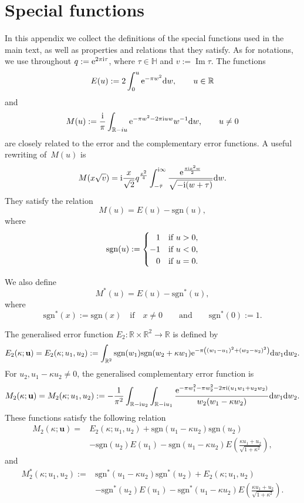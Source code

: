 \documentclass[10pt,a4paper]{amsart}
\def\be{\begin{equation}} \def\ee{\end{equation}}
\def\BR{\mathbb{R}}
\def\BH{\mathbb{H}}
\def\sgn{\mathrm{sgn}}
\theoremstyle{definition}
\numberwithin{equation}{section}
\begin{document}
\appendix

\section{Special functions}\label{app:specialFn}

In this appendix we collect the definitions of the special functions used in the main text, as well as properties and relations that they satisfy. As for notations, we use throughout $q:={\rm e}^{2\pi {\rm i}\tau}$, where $\tau \in \BH$ and $v:=\operatorname{Im} \tau$. The functions
\[ %
E(u) := 2\int_0^u {\rm e}^{-\pi w^2} {\rm d}w, \qquad u\in \mathbb{R}
\]
and	
\be \label{def:M}
M(u):=\frac{{\rm i}}{\pi} \int_{\mathbb{R} - i u}
{\rm e}^{-\pi w^2 -2\pi {\rm i} u w} w^{-1} {\rm d}w, \qquad u\neq 0
\ee
are closely related to the error and the complementary error functions. A useful rewriting of~$M(u)$ is \cite{zwegers2008mock}
\begin{equation}
\label{eq:error_rewriting}
M(x\sqrt{v})={\rm i}\frac{x}{\sqrt{2}} q^{\frac{x^2}{4}} \int_{-\bar{\tau}}^{{\rm i}\infty} \frac{{\rm e}^{\frac{\pi {\rm i} x^2 w}{2}}}{\sqrt{-{\rm i}(w+\tau)}}{\rm d}w .
\end{equation}
They satisfy the relation
\[
M(u)=E(u)-\sgn(u),
\]
where
\[
\sgn(u):=\begin{cases}
	\hphantom{-}1 & \text{if}\ u>0, \\
	-1 & \text{if}\ u<0, \\
	\hphantom{-}0 &\text{if}\ u=0.
\end{cases}
\]

We also define
\[
M^\ast(u)=E(u)-\sgn^\ast(u),
\]
where
\[
\sgn^*(x) := \sgn (x) \quad \text{if}\quad x\neq 0\qquad\text{and} \qquad \sgn^*(0) :=1 .
\]

The generalised error function $E_2\colon\BR\times \BR^2 \to \BR$ is defined by
\[
E_2(\kappa ; \mathbf{u}) = E_2(\kappa ; u_1,u_2) := \int_{\BR^2} \sgn(w_1) \sgn(w_2+\kappa w_1)
{\rm e}^{-\pi\left( (w_1-u_1)^2 + (w_2-u_2)^2 \right)} {\rm d}w_1 {\rm d}w_2 .
\]
For $u_2,u_1-\kappa u_2 \neq 0$, the generalised complementary error function is
\be \label{def:M2}
M_2(\kappa ; \mathbf{u}) = M_2(\kappa ; u_1,u_2) := - \frac{1}{\pi^2} \int_{\mathbb{R} - {\rm i} u_2} \int_{\mathbb{R} - {\rm i} u_1}
\frac{{\rm e}^{ -\pi w_1^2 -\pi w_2^2 - 2\pi {\rm i}
		(u_1 w_1 + u_2 w_2) }}{w_2(w_1-\kappa w_2)} {\rm d}w_1{\rm d}w_2 .
\ee
These functions satisfy the following relation
\begin{align*} %
	M_2 (\kappa ; \mathbf{u})
	={}& E_2(\kappa ; u_1, u_2) + \sgn(u_1-\kappa u_2) \sgn(u_2) \\
	& -\sgn(u_2) E(u_1) - \sgn(u_1-\kappa u_2) E \left( \frac{\kappa u_1 + u_2 }{\sqrt{1+\kappa^2}} \right),
\end{align*}
 and
\begin{align}
	M_2^*(\kappa ; u_1, u_2) :={}& \sgn^*(u_1-\kappa u_2) \sgn^*(u_2)
	+ E_2(\kappa; u_1,u_2) \nonumber \\
	& - \sgn^*(u_2) E(u_1) - \sgn^*(u_1-\kappa u_2)
	E\left( \frac{\kappa u_1 + u_2}{\sqrt{1+\kappa^2}} \right) . \label{def:M2star}
\end{align}
\end{document}

